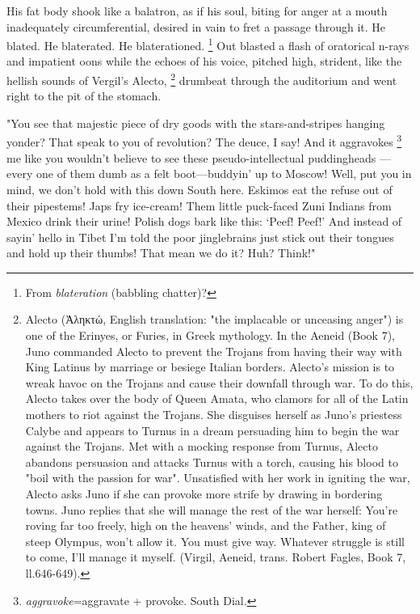   His fat body shook like a balatron, 
as if his soul, biting for anger at a mouth inadequately circumferential, 
desired in vain to fret 
a passage through it. He blated. 
He blaterated. 
He blaterationed. 
\footnote{ \textdbend From \textit{blateration} (babbling chatter)? }
Out blasted a flash of oratorical n-rays and impatient oons 
while the echoes of his voice, pitched high, strident, 
like the hellish sounds of Vergil's Alecto, 
\footnote{ Alecto (Ἀληκτώ, English translation: "the implacable or
unceasing anger") is one of the Erinyes, or Furies, in Greek mythology. In the
Aeneid (Book 7), Juno commanded Alecto to prevent the Trojans from having their
way with King Latinus by marriage or besiege Italian borders. Alecto's mission
is to wreak havoc on the Trojans and cause their downfall through war. To do
this, Alecto takes over the body of Queen Amata, who clamors for all of the
Latin mothers to riot against the Trojans. She disguises herself as Juno's
priestess Calybe and appears to Turnus in a dream persuading him to begin the
war against the Trojans. Met with a mocking response from Turnus, Alecto
abandons persuasion and attacks Turnus with a torch, causing his blood to "boil
with the passion for war". Unsatisfied with her work in igniting the war, Alecto
asks Juno if she can provoke more strife by drawing in bordering towns. Juno
replies that she will manage the rest of the war herself: You're roving far too
freely, high on the heavens' winds, and the Father, king of steep Olympus, won't
allow it. You must give way. Whatever struggle is still to come, I'll manage it
myself. (Virgil, Aeneid, trans. Robert Fagles, Book 7, ll.646-649).
}
drumbeat through the auditorium and went right to the pit of the stomach.
 
  "You see that majestic piece of dry goods with the stars-and-stripes hanging
yonder? 
That speak to you of revolution? The deuce, I say! And it aggravokes 
\footnote{ \textit{aggravoke}=aggravate + provoke. South Dial.}
me like you wouldn't believe to see these pseudo-intellectual puddingheads
---every one of them dumb as a felt boot---buddyin' up to Moscow! Well, 
put you in mind, we don't hold with this down South here. Eskimos eat the 
refuse out of their pipestems! 
Japs fry ice-cream! Them little puck-faced Zuni Indians from Mexico
drink their urine! Polish dogs bark like this: `Peef! Peef!' And instead of
sayin' hello in Tibet I'm told the poor jinglebrains just stick out their
tongues and hold up their thumbs! That mean we do it? Huh? Think!"

